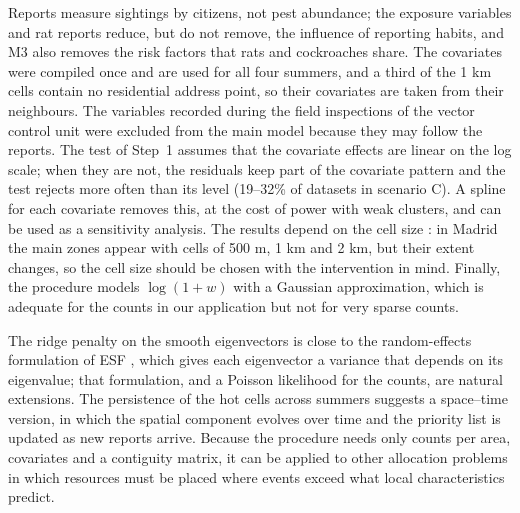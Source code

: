 Reports measure sightings by citizens, not pest abundance; the exposure variables and rat reports reduce, but do not remove, the influence of reporting habits, and M3 also removes the risk factors that rats and cockroaches share. The covariates were compiled once and are used for all four summers, and a third of the 1 km cells contain no residential address point, so their covariates are taken from their neighbours. The variables recorded during the field inspections of the vector control unit were excluded from the main model because they may follow the reports. The test of Step~1 assumes that the covariate effects are linear on the log scale; when they are not, the residuals keep part of the covariate pattern and the test rejects more often than its level (19--32\% of datasets in scenario C). A spline for each covariate removes this, at the cost of power with weak clusters, and can be used as a sensitivity analysis. The results depend on the cell size \citep{openshaw1984modifiable}: in Madrid the main zones appear with cells of 500 m, 1 km and 2 km, but their extent changes, so the cell size should be chosen with the intervention in mind. Finally, the procedure models $\log(1+w)$ with a Gaussian approximation, which is adequate for the counts in our application but not for very sparse counts.

 The ridge penalty on the smooth eigenvectors is close to the random-effects formulation of ESF \citep{murakami2015random}, which gives each eigenvector a variance that depends on its eigenvalue; that formulation, and a Poisson likelihood for the counts, are natural extensions. The persistence of the hot cells across summers suggests a space--time version, in which the spatial component evolves over time and the priority list is updated as new reports arrive. Because the procedure needs only counts per area, covariates and a contiguity matrix, it can be applied to other allocation problems in which resources must be placed where events exceed what local characteristics predict.
